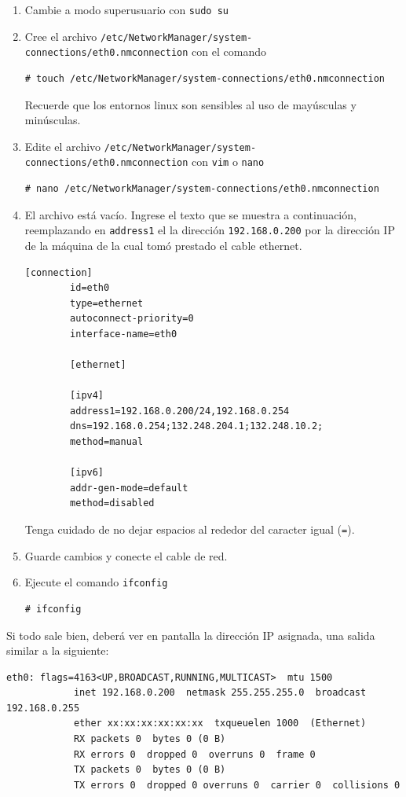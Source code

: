 \documentclass[letterpaper,10.5pt]{article}
\begin{document}
\begin{enumerate}
	\item Cambie a modo superusuario con \texttt{sudo su}

	\item Cree el archivo \texttt{/etc/NetworkManager/system-connections/eth0.nmconnection} con el comando
	\begin{Verbatim}[gobble=2]
		# touch /etc/NetworkManager/system-connections/eth0.nmconnection
	\end{Verbatim}
	Recuerde que los entornos linux son sensibles al uso de mayúsculas y minúsculas.

	\item Edite el archivo \texttt{/etc/NetworkManager/system-connections/eth0.nmconnection} con \texttt{vim} o \texttt{nano}
	\begin{Verbatim}[gobble=2]
		# nano /etc/NetworkManager/system-connections/eth0.nmconnection
	\end{Verbatim}

	\item El archivo está vacío.
	Ingrese el texto que se muestra a continuación, reemplazando en \texttt{address1} el la dirección \texttt{192.168.0.200} por la dirección IP de la máquina de la cual tomó prestado el cable ethernet.
	\begin{Verbatim}[fontsize=\footnotesize,gobble=2]
		[connection]
		id=eth0
		type=ethernet
		autoconnect-priority=0
		interface-name=eth0

		[ethernet]

		[ipv4]
		address1=192.168.0.200/24,192.168.0.254
		dns=192.168.0.254;132.248.204.1;132.248.10.2;
		method=manual

		[ipv6]
		addr-gen-mode=default
		method=disabled
	\end{Verbatim}
	Tenga cuidado de no dejar espacios al rededor del caracter igual (\texttt{=}).

	\item Guarde cambios y conecte el cable de red.

	\item Ejecute el comando \texttt{ifconfig}
	\begin{Verbatim}[gobble=2]
		# ifconfig
	\end{Verbatim}
\end{enumerate}

Si todo sale bien, deberá ver en pantalla la dirección IP asignada, una salida similar a la siguiente:
\begin{Verbatim}[gobble=1]
	eth0: flags=4163<UP,BROADCAST,RUNNING,MULTICAST>  mtu 1500
	        inet 192.168.0.200  netmask 255.255.255.0  broadcast 192.168.0.255
	        ether xx:xx:xx:xx:xx:xx  txqueuelen 1000  (Ethernet)
	        RX packets 0  bytes 0 (0 B)
	        RX errors 0  dropped 0  overruns 0  frame 0
	        TX packets 0  bytes 0 (0 B)
	        TX errors 0  dropped 0 overruns 0  carrier 0  collisions 0
\end{Verbatim}
\end{document}
